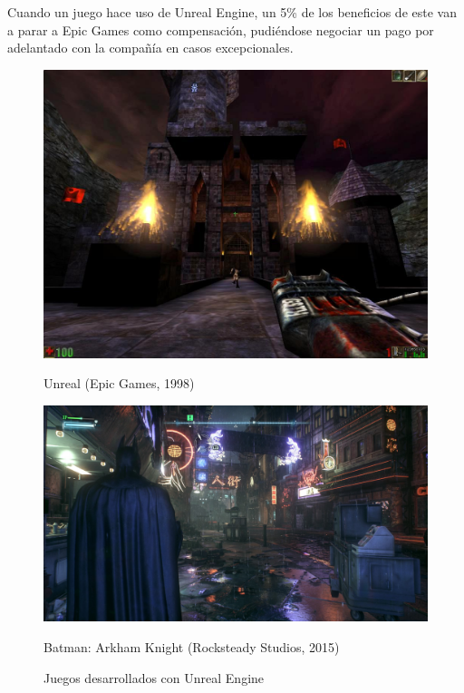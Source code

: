 Cuando un juego hace uso de Unreal Engine, un 5\% de los beneficios de este van a parar a Epic Games como compensación, pudiéndose negociar un pago por adelantado con la compañía en casos excepcionales.
\begin{figure}[!htb]
   \begin{minipage}{0.5\textwidth}
     \centering
     \includegraphics[width=0.85\linewidth, right]{images/estadodelarte/motores/unreal-original}
     \caption{Unreal (Epic Games, 1998)}
   \end{minipage}\hfill
   \begin {minipage}{0.5\textwidth}
     \centering
     \includegraphics[width=0.85\linewidth, left]{images/estadodelarte/motores/batman-arkham}
     \caption{Batman: Arkham Knight (Rocksteady Studios, 2015)}
   \end{minipage}
   \caption{Juegos desarrollados con Unreal Engine}
\end{figure}

